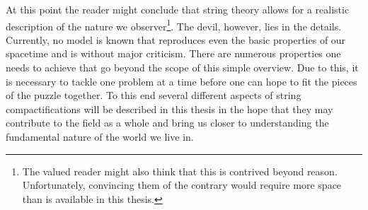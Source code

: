 \documentclass[a4paper,12pt]{report}
\begin{document}
At this point the reader might conclude that string theory allows for a realistic description of the nature we observer\footnote{The valued reader might also think that this is contrived beyond reason. Unfortunately, convincing them of the contrary would require more space than is available in this thesis.}. The devil, however, lies in the details. Currently, no model is known that reproduces even the basic properties of our spacetime and is without major criticism. There are numerous properties one needs to achieve that go beyond the scope of this simple overview. Due to this, it is necessary to tackle one problem at a time before one can hope to fit the pieces of the puzzle together. To this end several different aspects of string compactifications will be described in this thesis in the hope that they may contribute to the field as a whole and bring us closer to understanding the fundamental nature of the world we live in.
\end{document}
